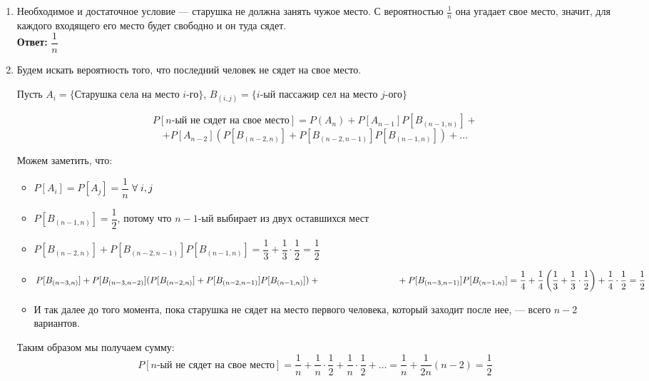 \documentclass[a4paper,12pt]{article}
\theoremstyle{plain}                         %
\theoremstyle{definition}                  %
\theoremstyle{remark}                      %
\begin{document}
\begin{enumerate}
\item Необходимое и достаточное условие --- старушка не должна занять чужое место. С вероятностью $\frac{1}{n}$ она угадает свое место, значит, для каждого входящего его место будет свободно и он туда сядет.\\
\textbf{Ответ:} $\dfrac{1}{n}$
\item Будем искать вероятность того, что последний человек не сядет на свое место. 

Пусть $A_i = \{\text{Старушка села на  место } i\text{-го} \}$,  $B_{(i,j)} = \{i \text{-ый  пассажир сел на место } j\text{-ого} \}$

$$
P[n\text{-ый не сядет на свое место}] = P(A_n) + P[A_{n-1}]P[B_{(n-1,n)}]+ 
$$
$$
+ P[A_{n-2}](P[B_{(n-2,n)}] 
+ P[B_{(n-2,n-1)}]P[B_{(n-1,n)}]  ) + \dots 
$$

Можем заметить, что:
\renewcommand{\labelitemi}{$\checkmark$}
\begin{itemize}
\item $P[A_i] = P[A_j] = \dfrac{1}{n}$ $\forall \hspace{0.1cm} i, j$
\item $P[B_{(n-1,n)}]=\dfrac{1}{2}$, потому что $n-1$-ый выбирает из двух оставшихся мест
\item $P[B_{(n-2,n)}] 
+ P[B_{(n-2,n-1)}]P[B_{(n-1,n)}]  = \dfrac{1}{3} + \dfrac{1}{3}\cdot \dfrac{1}{2} = \dfrac{1}{2}$
\item $P[B_{(n-3,n)}] + P[B_{(n-3,n-2)}](P[B_{(n-2,n)}]+P[B_{(n-2,n-1)}]P[B_{(n-1,n)}])+\vspace{0.5cm} \\
\hspace*{3cm} + P[B_{(n-3,n-1)}]P[B_{(n-1,n)}] =   \dfrac{1}{4}+\dfrac{1}{4}\left(\dfrac{1}{3}+\dfrac{1}{3}\cdot\dfrac{1}{2}\right) +\dfrac{1}{4}\cdot \dfrac{1}{2} = \dfrac{1}{2}$
\item И так далее до того момента, пока старушка не сядет на место первого человека, который заходит после нее, --- всего $n-2$ вариантов.
\end{itemize}

Таким образом мы получаем сумму:
$$
P[n\text{-ый не сядет на свое место}] = \dfrac{1}{n} + \dfrac{1}{n}\cdot \dfrac{1}{2} + \dfrac{1}{n}\cdot \dfrac{1}{2} + \dots = \dfrac{1}{n}  + \frac{1}{2n}(n-2) = \dfrac{1}{2}
$$
\begin{center}
\end{center}


\end{enumerate}
\end{document}
